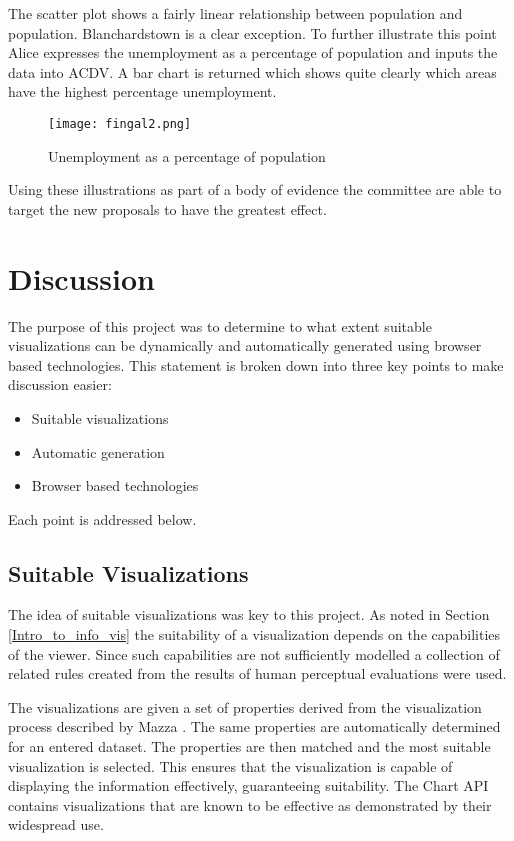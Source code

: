 \documentclass[a4paper, 11pt, titlepage, onehalfspacing]{report}
\begin{document}
The scatter plot shows a fairly linear relationship between population and population.  Blanchardstown is a clear exception. To further illustrate this point Alice expresses the unemployment as a percentage of population and inputs the data into AC\lightning{}DV. A bar chart is returned which shows quite clearly which areas have the highest percentage unemployment. 

\begin{figure}[htp] \centering
\texttt{[image: fingal2.png]}
\caption{Unemployment as a percentage of population}
\label{fingal1}
\end{figure}


Using these illustrations as part of a body of evidence the committee are able to target the new proposals to have the greatest effect.

\section{Discussion}
\label{Discussion}
The purpose of this project was to determine to what extent suitable visualizations can be dynamically and automatically generated using browser based technologies. This statement is broken down into three key points to make discussion easier:

\begin{itemize}
\item Suitable visualizations
\item Automatic generation
\item Browser based technologies
\end{itemize}

Each point is addressed below.

\subsection{Suitable Visualizations}
The idea of suitable visualizations was key to this project. As noted in Section \ref{Intro_to_info_vis} the suitability of a visualization depends on the capabilities of the viewer. Since such capabilities are not sufficiently modelled a collection of related rules created from the results of human perceptual evaluations were used.

The visualizations are given a set of properties derived from the visualization process described by Mazza \cite{mazza2009introduction}. The same properties are automatically determined for an entered dataset. The properties are then matched and the most suitable visualization is selected. This ensures that the visualization is capable of displaying the information effectively, guaranteeing suitability. The Chart API contains visualizations that are known to be effective as demonstrated by their widespread use.
\end{document}
